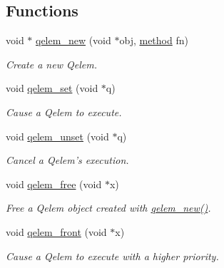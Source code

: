 \subsection*{Functions}
\begin{DoxyCompactItemize}
\item 
void $\ast$ \hyperlink{group__qelems_gaffa7e9d4d5468a8ae3c825a353609b1b}{qelem\_\-new} (void $\ast$obj, \hyperlink{group__datatypes_gac26ba0a173b50597f5738132e059b42d}{method} fn)
\begin{DoxyCompactList}\small\item\em Create a new Qelem. \item\end{DoxyCompactList}\item 
void \hyperlink{group__qelems_ga3e292aad133af89a87e167e88cc4a1b5}{qelem\_\-set} (void $\ast$q)
\begin{DoxyCompactList}\small\item\em Cause a Qelem to execute. \item\end{DoxyCompactList}\item 
void \hyperlink{group__qelems_ga021eca2eff6e47ff97ca112fb2eaf866}{qelem\_\-unset} (void $\ast$q)
\begin{DoxyCompactList}\small\item\em Cancel a Qelem’s execution. \item\end{DoxyCompactList}\item 
void \hyperlink{group__qelems_ga7cfcb3134eb0baf335847906a14a08d0}{qelem\_\-free} (void $\ast$x)
\begin{DoxyCompactList}\small\item\em Free a Qelem object created with \hyperlink{group__qelems_gaffa7e9d4d5468a8ae3c825a353609b1b}{qelem\_\-new()}. \item\end{DoxyCompactList}\item 
void \hyperlink{group__qelems_gab5fa3e43e7851d1a2049ee28f5275955}{qelem\_\-front} (void $\ast$x)
\begin{DoxyCompactList}\small\item\em Cause a Qelem to execute with a higher priority. \item\end{DoxyCompactList}\end{DoxyCompactItemize}


